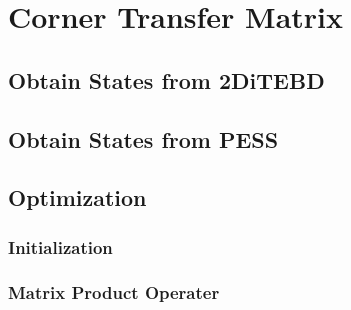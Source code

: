 \chapter{Corner Transfer Matrix}
\label{chapter:ctm}

\section{Obtain States from 2DiTEBD}
\label{2ditebdctm}

\section{Obtain States from PESS}
\label{pessctm}

\section{Optimization}
\label{optctm}

\subsection{Initialization}
\label{optctminit}

\subsection{Matrix Product Operater}
\label{optctmmpo}


